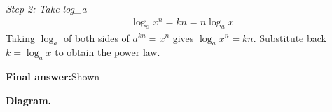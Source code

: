 \documentclass[11pt]{article}
\begin{document}
\textit{Step 2: Take log\_a}
\[\begin{gathered}
\log_a x^n = kn = n\log_a x
\end{gathered}\]
Taking \( \log_a \) of both sides of \( a^{kn} = x^n \) gives \( \log_a x^n = kn \). Substitute back \( k = \log_a x \) to obtain the power law.

\begin{answerbox}
\textbf{Final answer:}\quad Shown
\end{answerbox}
\textbf{Diagram.}

\begin{center}
\end{center}
\end{document}
